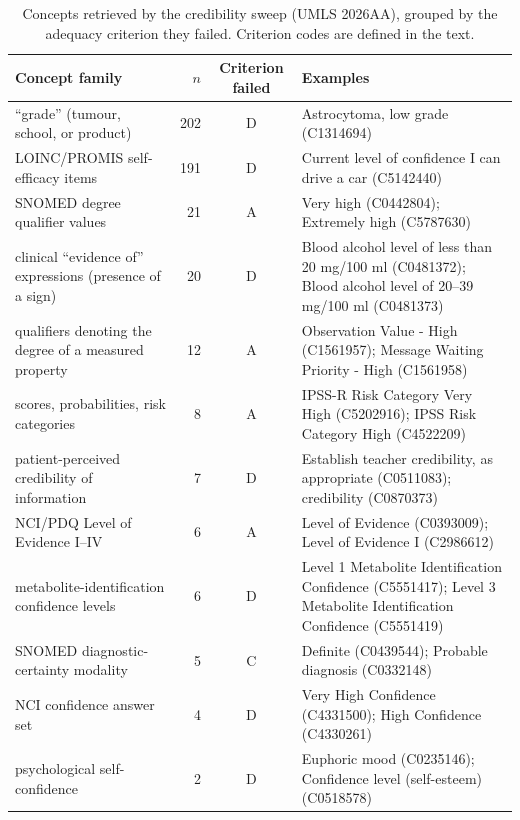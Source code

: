 \begin{table}[H]
  \centering
  \small
  \caption[Credibility sweep: rejected concept families]{Concepts retrieved by
  the credibility sweep (UMLS 2026AA), grouped by the adequacy criterion they
  failed. Criterion codes are defined in the text.}
  \label{tab:cred-families}
  \begin{tabularx}{\linewidth}{@{}>{\raggedright\arraybackslash}X r c >{\raggedright\arraybackslash}X@{}}
    \toprule
    Concept family & $n$ & Criterion failed & Examples \\
    \midrule
        “grade” (tumour, school, or product) & 202 & D & Astrocytoma, low grade (C1314694) \\
        LOINC/PROMIS self-efficacy items & 191 & D & Current level of confidence I can drive a car (C5142440) \\
        SNOMED degree qualifier values & 21 & A & Very high (C0442804); Extremely high (C5787630) \\
        clinical “evidence of” expressions (presence of a sign) & 20 & D & Blood alcohol level of less than 20 mg/100 ml (C0481372); Blood alcohol level of 20--39 mg/100 ml (C0481373) \\
        qualifiers denoting the degree of a measured property & 12 & A & Observation Value - High (C1561957); Message Waiting Priority - High (C1561958) \\
        scores, probabilities, risk categories & 8 & A & IPSS-R Risk Category Very High (C5202916); IPSS Risk Category High (C4522209) \\
        patient-perceived credibility of information & 7 & D & Establish teacher credibility, as appropriate (C0511083); credibility (C0870373) \\
        NCI/PDQ Level of Evidence I--IV & 6 & A & Level of Evidence (C0393009); Level of Evidence I (C2986612) \\
        metabolite-identification confidence levels & 6 & D & Level 1 Metabolite Identification Confidence (C5551417); Level 3 Metabolite Identification Confidence (C5551419) \\
        SNOMED diagnostic-certainty modality & 5 & C & Definite (C0439544); Probable diagnosis (C0332148) \\
        NCI confidence answer set & 4 & D & Very High Confidence (C4331500); High Confidence (C4330261) \\
        psychological self-confidence & 2 & D & Euphoric mood (C0235146); Confidence level (self-esteem) (C0518578) \\

\end{tabularx}
\end{table}
